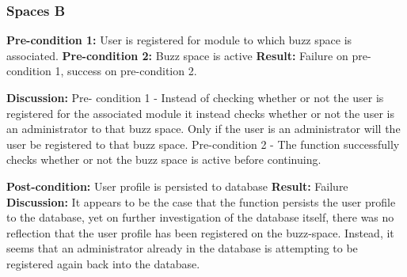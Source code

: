 
\subsubsection{Spaces B}
\textbf{Pre-condition 1:} User is registered for module to which buzz space is associated. \newline
\textbf{Pre-condition 2:}  Buzz space is active\newline
\textbf{Result:} Failure on pre-condition 1, success on pre-condition 2.\newline\newline

\textbf{Discussion:} Pre- condition 1 - Instead of checking whether or not the user is registered for the associated module it instead checks whether or not the user is an administrator to that buzz space. Only if the user is an administrator will the user be registered to that buzz space. Pre-condition 2 - The function successfully checks whether or not the buzz space is active before continuing. 
\newline \newline

\textbf{Post-condition:} User profile is persisted to database \newline
\textbf{Result:} Failure\newline\newline
\textbf{Discussion:} It appears to be the case that the function persists the user profile to the database, yet on further investigation of the database itself, there was no reflection that the user profile has been registered on the buzz-space. Instead, it seems that an administrator already in the database is attempting to be registered again back into the database.